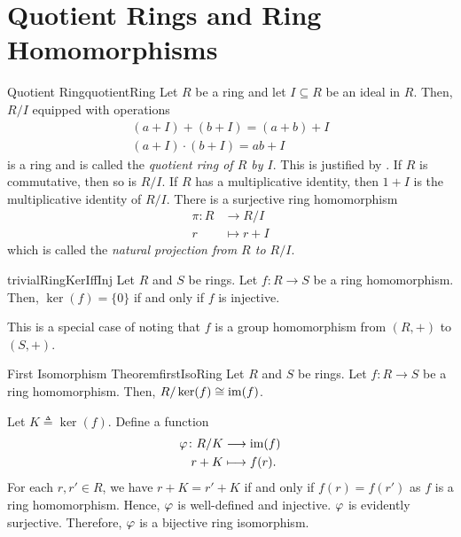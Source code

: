 \documentclass[../modern_algebra.tex]{subfiles}
\begin{document}
\section{Quotient Rings and Ring Homomorphisms}

\begin{Definition}[colbacktitle=red!75!black]{Quotient Ring}{quotientRing}
    Let \(R\) be a ring and let \(I \subseteq R\) be an ideal in \(R\).
    Then, \(R/I\) equipped with operations
    \begin{gather*}
        (a + I) + (b + I) = (a + b) + I \\
        (a+I) \cdot (b+I) = ab + I
    \end{gather*}
    is a ring and is called the \textit{quotient ring of \(R\) by \(I\)}.
    This is justified by .
    \vspace*{1em}
    If \(R\) is commutative, then so is \(R/I\).
    If \(R\) has a multiplicative identity, then \(1 + I\) is
    the multiplicative identity of \(R/I\).
    \vspace*{1em}
    There is a surjective ring homomorphism
    \begin{align*}
        \pi \colon R &\longrightarrow R/I \\
        r &\longmapsto r + I
    \end{align*}
    which is called the \textit{natural projection from \(R\) to \(R/I\)}.
\end{Definition}

\begin{Lemma}{}{trivialRingKerIffInj}
    Let \(R\) and \(S\) be rings.
    Let \(f \colon R \to S\) be a ring homomorphism.
    Then, \(\ker(f) = \{0\}\) if and only if \(f\) is injective.
\end{Lemma}
\begin{myproof}[Proof]
    This is a special case of 
    noting that \(f\) is a group homomorphism from \((R, +)\) to \((S, +)\).
\end{myproof}

\begin{Theorem}{\textsf{First Isomorphism Theorem}}{firstIsoRing}
    Let \(R\) and \(S\) be rings.
    Let \(f \colon R \to S\) be a ring homomorphism.
    Then, \(R/\ker(f) \cong \operatorname{im}(f)\).
\end{Theorem}
\begin{myproof}[Proof]
    Let \(K \triangleq \ker(f)\).
    Define a function
    \begin{align*}
        \varphi \colon R/K &\longrightarrow \operatorname{im}(f) \\
        r + K &\longmapsto f(r).
    \end{align*}
    For each \(r, r' \in R\), we have \(r + K = r' + K\) if and only if \(f(r) = f(r')\)
    as \(f\) is a ring homomorphism.
    Hence, \(\varphi\) is well-defined and injective.
    \(\varphi\) is evidently surjective.
    Therefore, \(\varphi\) is a bijective ring isomorphism.
\end{myproof}
\end{document}
